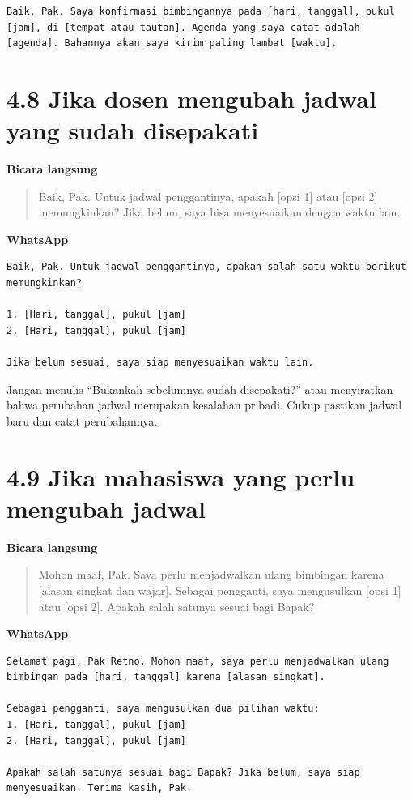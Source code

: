 \documentclass[
  indonesian,
]{article}
\renewcommand{\subsection}{\section}
\begin{document}
\begin{verbatim}
Baik, Pak. Saya konfirmasi bimbingannya pada [hari, tanggal], pukul [jam], di [tempat atau tautan]. Agenda yang saya catat adalah [agenda]. Bahannya akan saya kirim paling lambat [waktu].
\end{verbatim}

\subsection{4.8 Jika dosen mengubah jadwal yang sudah
disepakati}\label{jika-dosen-mengubah-jadwal-yang-sudah-disepakati}

\textbf{Bicara langsung}

\begin{quote}
Baik, Pak. Untuk jadwal penggantinya, apakah {[}opsi 1{]} atau {[}opsi
2{]} memungkinkan? Jika belum, saya bisa menyesuaikan dengan waktu lain.
\end{quote}

\textbf{WhatsApp}

\begin{verbatim}
Baik, Pak. Untuk jadwal penggantinya, apakah salah satu waktu berikut memungkinkan?

1. [Hari, tanggal], pukul [jam]
2. [Hari, tanggal], pukul [jam]

Jika belum sesuai, saya siap menyesuaikan waktu lain.
\end{verbatim}

Jangan menulis ``Bukankah sebelumnya sudah disepakati?'' atau
menyiratkan bahwa perubahan jadwal merupakan kesalahan pribadi. Cukup
pastikan jadwal baru dan catat perubahannya.

\subsection{4.9 Jika mahasiswa yang perlu mengubah
jadwal}\label{jika-mahasiswa-yang-perlu-mengubah-jadwal}

\textbf{Bicara langsung}

\begin{quote}
Mohon maaf, Pak. Saya perlu menjadwalkan ulang bimbingan karena
{[}alasan singkat dan wajar{]}. Sebagai pengganti, saya mengusulkan
{[}opsi 1{]} atau {[}opsi 2{]}. Apakah salah satunya sesuai bagi Bapak?
\end{quote}

\textbf{WhatsApp}

\begin{verbatim}
Selamat pagi, Pak Retno. Mohon maaf, saya perlu menjadwalkan ulang bimbingan pada [hari, tanggal] karena [alasan singkat].

Sebagai pengganti, saya mengusulkan dua pilihan waktu:
1. [Hari, tanggal], pukul [jam]
2. [Hari, tanggal], pukul [jam]

Apakah salah satunya sesuai bagi Bapak? Jika belum, saya siap menyesuaikan. Terima kasih, Pak.
\end{verbatim}
\end{document}
